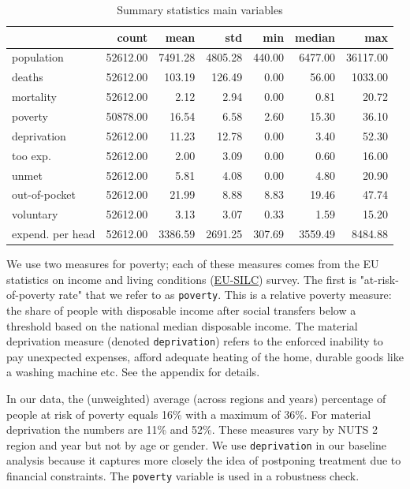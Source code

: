 \documentclass[a4paper,12pt]{article}
\begin{document}
\begin{table}[htbp]
\caption{\label{tab:summary}Summary statistics main variables}
\centering
\begin{tabular}{lrrrrrr}
 & count & mean & std & min & median & max\\
\hline
population & 52612.00 & 7491.28 & 4805.28 & 440.00 & 6477.00 & 36117.00\\
deaths & 52612.00 & 103.19 & 126.49 & 0.00 & 56.00 & 1033.00\\
mortality & 52612.00 & 2.12 & 2.94 & 0.00 & 0.81 & 20.72\\
poverty & 50878.00 & 16.54 & 6.58 & 2.60 & 15.30 & 36.10\\
deprivation & 52612.00 & 11.23 & 12.78 & 0.00 & 3.40 & 52.30\\
too exp. & 52612.00 & 2.00 & 3.09 & 0.00 & 0.60 & 16.00\\
unmet & 52612.00 & 5.81 & 4.08 & 0.00 & 4.80 & 20.90\\
out-of-pocket & 52612.00 & 21.99 & 8.88 & 8.83 & 19.46 & 47.74\\
voluntary & 52612.00 & 3.13 & 3.07 & 0.33 & 1.59 & 15.20\\
expend. per head & 52612.00 & 3386.59 & 2691.25 & 307.69 & 3559.49 & 8484.88\\
\end{tabular}
\end{table}

We use two measures for poverty; each of these measures comes from the EU statistics on income and living conditions (\href{https://ec.europa.eu/eurostat/statistics-explained/index.php?title=Glossary:EU\_statistics\_on\_income\_and\_living\_conditions\_(EU-SILC)}{EU-SILC}) survey. The first is "at-risk-of-poverty rate" that we refer to as \texttt{poverty}. This is a relative poverty measure: the share of people with disposable income after social transfers below a threshold based on the national median disposable income. The material deprivation measure (denoted \texttt{deprivation}) refers to the enforced inability to pay unexpected expenses, afford adequate heating of the home, durable goods like a washing machine etc. See the appendix for details.

In our data, the (unweighted) average (across regions and years) percentage of people at risk of poverty equals 16\% with a maximum of 36\%. For material deprivation the numbers are 11\% and 52\%. These measures vary by NUTS 2 region and year but not by age or gender. We use \texttt{deprivation} in our baseline analysis because it captures more closely the idea of postponing treatment due to financial constraints. The \texttt{poverty} variable is used in a robustness check.
\end{document}
